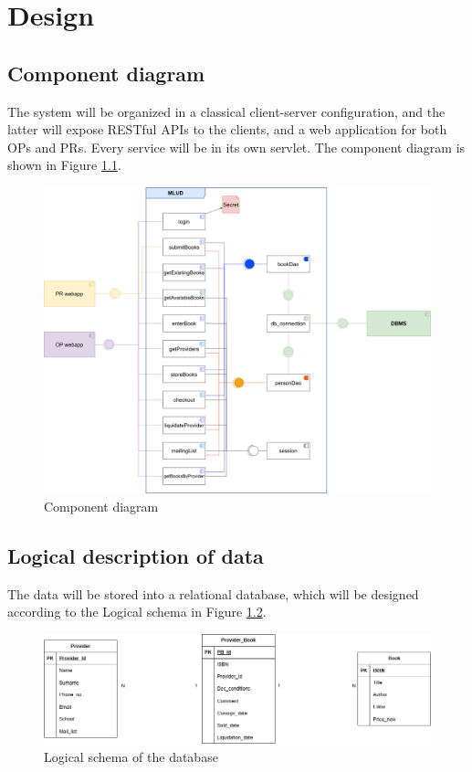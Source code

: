 \chapter{Design}

\section{Component diagram}

The system will be organized in a classical client-server configuration, and the latter will expose RESTful APIs to the clients, and a web application for both OPs and PRs. Every service will be in its own servlet. The component diagram is shown in Figure \ref{fig:component}.

\begin{figure}[h]
    \centering
    \includegraphics[width=\textwidth]{assets/component_diagram.png}
    \caption{Component diagram}
    \label{fig:component}
\end{figure}

\section{Logical description of data}

The data will be stored into a relational database, which will be designed according to the Logical schema in Figure \ref{fig:er}.

\begin{figure}[h]
    \centering
    \includegraphics[width=\textwidth]{assets/er_diagram.png}
    \caption{Logical schema of the database}
    \label{fig:er}
\end{figure}

